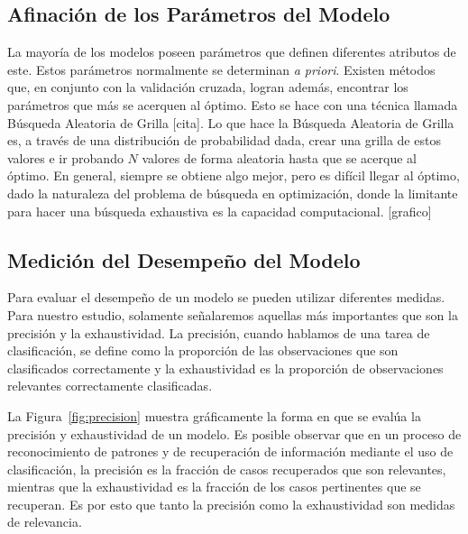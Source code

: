
\subsection{Afinación de los Parámetros del Modelo}
La mayoría de los modelos poseen parámetros que definen diferentes atributos de este. Estos parámetros normalmente se determinan \textit{a priori}. Existen métodos que, en conjunto con la validación cruzada, logran además, encontrar los parámetros que más se acerquen al óptimo. Esto se hace con una técnica llamada Búsqueda Aleatoria de Grilla [cita]. Lo que hace la Búsqueda Aleatoria de Grilla es, a través de una distribución de probabilidad dada, crear una grilla de estos valores e ir probando $N$ valores de forma aleatoria hasta que se acerque al óptimo. En general, siempre se obtiene algo mejor, pero es difícil llegar al óptimo, dado la naturaleza del problema de búsqueda en optimización, donde la limitante para hacer una búsqueda exhaustiva es la capacidad computacional.
[grafico]

\subsection{Medición del Desempeño del Modelo}

Para evaluar el desempeño de un modelo se pueden utilizar diferentes medidas. Para nuestro estudio, solamente señalaremos aquellas más importantes que son la precisión y la exhaustividad. La precisión, cuando hablamos de una tarea de clasificación, se define como la proporción de las observaciones que son clasificados correctamente y la exhaustividad es la proporción de observaciones relevantes correctamente clasificadas.

La Figura~\ref{fig:precision} muestra gráficamente la forma en que se evalúa la precisión y exhaustividad de un modelo. Es posible observar que en un proceso de reconocimiento de patrones y de recuperación de información mediante el uso de  clasificación, la precisión es la fracción de casos recuperados que son relevantes, mientras que la exhaustividad es la fracción de los casos pertinentes que se recuperan. Es por esto que tanto la precisión como la exhaustividad son medidas de relevancia.


